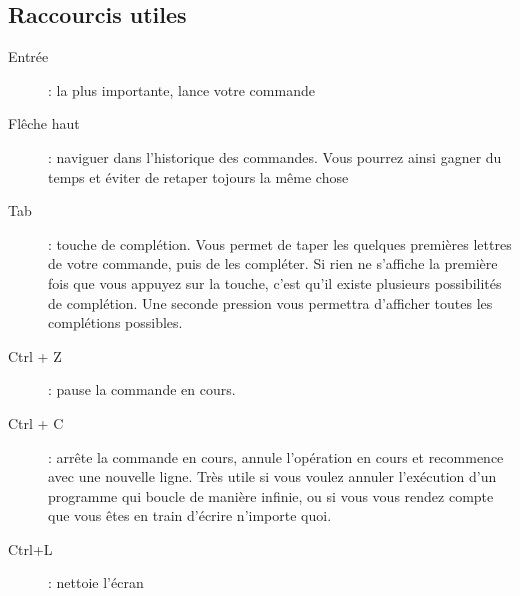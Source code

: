 \documentclass[french, a4paper, 12pt, titlepage]{article}
\begin{document}
\subsection{Raccourcis utiles}
\begin{description}
\item[Entrée]: la plus importante, lance votre commande
\item[Flêche haut]: naviguer dans l'historique des commandes. Vous pourrez ainsi gagner du temps et éviter de retaper tojours la même chose
\item[Tab]: touche de complétion. Vous permet de taper les quelques premières lettres de votre commande, puis de les compléter. Si rien ne s'affiche la première fois que vous appuyez sur la touche, c'est qu'il existe plusieurs possibilités de complétion. Une seconde pression vous permettra d'afficher toutes les complétions possibles.
\item[Ctrl + Z]: pause la commande en cours.
\item[Ctrl + C]: arrête la commande en cours, annule l'opération en cours et recommence avec une nouvelle ligne. Très utile si vous voulez annuler l'exécution d'un programme qui boucle de manière infinie, ou si vous vous rendez compte que vous êtes en train d'écrire n'importe quoi.
\item[Ctrl+L]: nettoie l'écran
\end{description}
\end{document}
